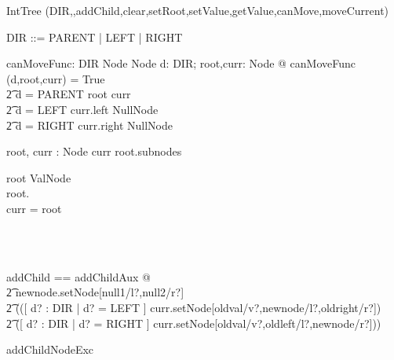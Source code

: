 \begin{class}{IntTree}
\visibility (DIR,\Init,addChild,clear,setRoot,setValue,getValue,canMove,moveCurrent) \\
\begin{zed}
DIR ::= PARENT | LEFT | RIGHT
\end{zed}
\begin{axdef}
	canMoveFunc: DIR \cross Node \cross Node \fun \bool
\where
	\forall d: DIR; root,curr: Node @ canMoveFunc (d,root,curr) = True \iff \\
		\t2 d = PARENT \land root \neq curr \lor \\
		\t2 d = LEFT \land curr.left \notin NullNode \lor \\
		\t2 d = RIGHT \land curr.right \notin NullNode
\end{axdef}
\begin{state}
	root, curr : Node
\where
	curr \in root.subnodes
\end{state}
\begin{init}
	root \in ValNode \\
        root.\Init \\
        curr = root
\end{init}\\
\\
addChild == addChildAux @ \\
	\t2 newnode.setNode[null1/l?,null2/r?] \land \\
	\t2 (([ d? : DIR | d? = LEFT ]
		\land curr.setNode[oldval/v?,newnode/l?,oldright/r?]) \gch \\
	\t2 ([ d? : DIR | d? = RIGHT ]
		\land curr.setNode[oldval/v?,oldleft/l?,newnode/r?]))\\
\begin{op}{addChildNodeExc}

\end{op}
\end{class}
